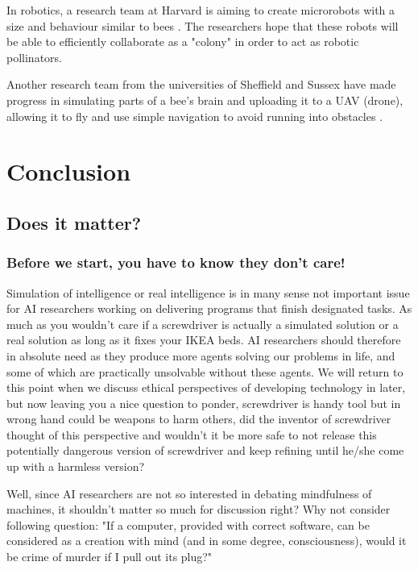 \documentclass[11pt]{article}
\newenvironment{sketch}{\color{dark-green-2}}{\ignorespacesafterend}
\newenvironment{draft}{\color{dark-cornflower-blue-2}}{\ignorespacesafterend}
\begin{document}
\begin{sketch}
In robotics, a research team at Harvard is aiming to create microrobots with a size and behaviour similar to bees \cite{robobees2015}. The researchers hope that these robots will be able to efficiently collaborate as a "colony" in order to act as robotic pollinators.

Another research team from the universities of Sheffield and Sussex have made progress in simulating parts of a bee's brain and uploading it to a UAV (drone), allowing it to fly and use simple navigation to avoid running into obstacles \cite{greenbrain2015}.

\end{sketch}

\section{Conclusion}
\label{sec:conclusion}

\subsection{Does it matter?}

\subsubsection*{Before we start, you have to know they don't care!}
\begin{draft}
Simulation of intelligence or real intelligence is in many sense not important issue for AI researchers working on delivering programs that finish designated tasks. As much as you wouldn't care if a screwdriver is actually a simulated solution or a real solution as long as it fixes your IKEA beds. AI researchers should therefore in absolute need as they produce more agents solving our problems in life, and some of which are practically unsolvable without these agents. We will return to this point when we discuss ethical perspectives of developing technology in later, but now leaving you a nice question to ponder, screwdriver is handy tool but in wrong hand could be weapons to harm others, did the inventor of screwdriver thought of this perspective and wouldn’t it be more safe to not release this potentially dangerous version of screwdriver and keep refining until he/she come up with a harmless version?
  
Well, since AI researchers are not so interested in debating mindfulness of machines, it shouldn't matter so much for discussion right? Why not consider following question: "If a computer, provided with correct software, can be considered as a creation with mind (and in some degree, consciousness), would it be crime of murder if I pull out its plug?"
\end{draft}
\end{document}
